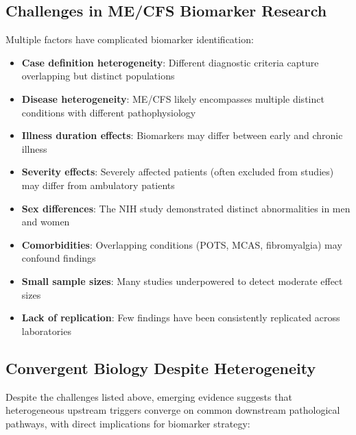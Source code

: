 \subsection{Challenges in ME/CFS Biomarker Research}

Multiple factors have complicated biomarker identification:

\begin{itemize}
    \item \textbf{Case definition heterogeneity}: Different diagnostic criteria capture overlapping but distinct populations
    \item \textbf{Disease heterogeneity}: ME/CFS likely encompasses multiple distinct conditions with different pathophysiology
    \item \textbf{Illness duration effects}: Biomarkers may differ between early and chronic illness
    \item \textbf{Severity effects}: Severely affected patients (often excluded from studies) may differ from ambulatory patients
    \item \textbf{Sex differences}: The NIH study demonstrated distinct abnormalities in men and women
    \item \textbf{Comorbidities}: Overlapping conditions (POTS, MCAS, fibromyalgia) may confound findings
    \item \textbf{Small sample sizes}: Many studies underpowered to detect moderate effect sizes
    \item \textbf{Lack of replication}: Few findings have been consistently replicated across laboratories
\end{itemize}

\subsection{Convergent Biology Despite Heterogeneity}

Despite the challenges listed above, emerging evidence suggests that heterogeneous upstream triggers converge on common downstream pathological pathways, with direct implications for biomarker strategy:

